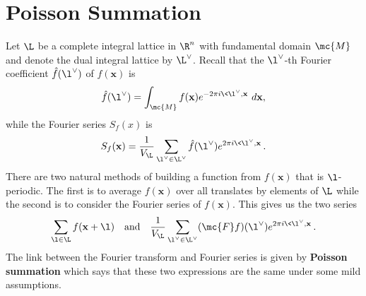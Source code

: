   \chapter{Poisson Summation}\label{ch:Poisson_summation}
    Let \(\L\) be a complete integral lattice in \(\R^{n}\) with fundamental domain \(\mc{M}\) and denote the dual integral lattice by \(\L^{\vee}\). Recall that the \(\l^{\vee}\)-th Fourier coefficient \(\hat{f}(\l^{\vee})\) of \(f(\mathbf{x})\) is
    \[
      \hat{f}(\l^{\vee}) = \int_{\mc{M}}f(\mathbf{x})e^{-2\pi i\<\l^{\vee},\mathbf{x}\>}\,d\mathbf{x},
    \]
    while the Fourier series \(S_{f}(x)\) is
    \[
      S_{f}(\mathbf{x}) = \frac{1}{V_{\L}}\sum_{\l^{\vee} \in \L^{\vee}}\hat{f}(\l^{\vee})e^{2\pi i\<\l^{\vee},\mathbf{x}\>}.
    \]
    There are two natural methods of building a function from \(f(\mathbf{x})\) that is \(\l\)-periodic. The first is to average \(f(\mathbf{x})\) over all translates by elements of \(\L\) while the second is to consider the Fourier series of \(f(\mathbf{x})\). This gives us the two series
    \[
      \sum_{\l \in \L}f(\mathbf{x}+\l) \quad \text{and} \quad \frac{1}{V_{\L}}\sum_{\l^{\vee} \in \L^{\vee}}(\mc{F}f)(\l^{\vee})e^{2\pi i\<\l^{\vee},\mathbf{x}\>}.
    \]
    The link between the Fourier transform and Fourier series is given by \textbf{Poisson summation} which says that these two expressions are the same under some mild assumptions.

